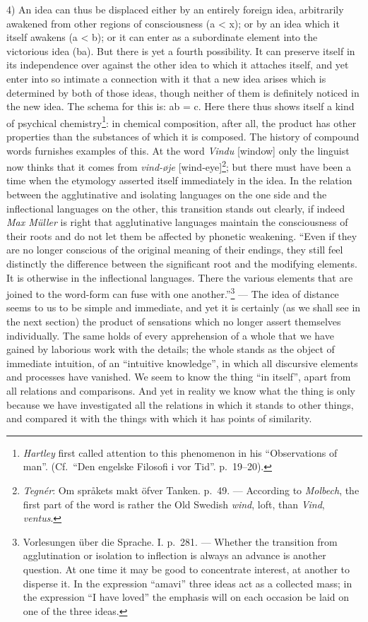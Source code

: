 \documentclass[12pt,a4paper]{book}
\newcommand{\opage}[1]{\marginnote{\footnotesize\textit{[#1]}}}
\begin{document}
4) An idea can thus be displaced either by an entirely foreign idea,
arbitrarily awakened from other regions of consciousness (a < x); or by
an idea which it itself awakens (a < b); or it can enter as a
subordinate element into the victorious idea (ba). But there is yet a
fourth possibility. It can preserve itself in its independence over
against the other idea to which it attaches itself, and yet enter into
so intimate a connection with it that a new idea arises which is
determined by both of those ideas, though neither of them is definitely
noticed in the new idea. The schema for this is: ab = c. Here there
thus shows itself
\opage{198}a kind of psychical chemistry\footnote{\emph{Hartley} first
called attention to this phenomenon in his ``Observations of man''.
(Cf.\ ``Den engelske Filosofi i vor Tid''. p.~19--20).}: in chemical
composition, after all, the product has other properties than the
substances of which it is composed. The history of compound words
furnishes examples of this. At the word \textit{Vindu} [window] only the
linguist now thinks that it comes from
\textit{vind-øje} [wind-eye]\footnote{\emph{Tegnér}: Om språkets makt
öfver Tanken. p.~49. --- According to \emph{Molbech}, the first part of
the word is rather the Old Swedish \textit{wind}, loft, than
\textit{Vind}, \textit{ventus}.}; %
but there must have been a time when the etymology asserted itself
immediately in the idea. In the relation between the agglutinative and
isolating languages on the one side and the inflectional languages on
the other, this transition stands out clearly, if indeed \emph{Max
Müller} is right that agglutinative languages maintain the consciousness
of their roots and do not let them be affected by phonetic weakening.
``Even if they are no longer conscious of the original meaning of their
endings, they still feel distinctly the difference between the
significant root and the modifying elements. It is otherwise in the
inflectional languages. There the various elements that are joined to
the word-form can fuse with one another.''\footnote{Vorlesungen über die
Sprache. I. p.~281. --- Whether the transition from agglutination or
isolation to inflection is always an advance is another question. At
one time it may be good to concentrate interest, at another to disperse
it. In the expression ``amavi'' three ideas act as a collected mass; in
the expression ``I have loved'' the emphasis will on each occasion be
laid on one of the three ideas.} --- The idea of distance seems to us to
be simple and immediate, and yet it is certainly (as we shall see in the
next section) the product of sensations which no longer assert
themselves individually. The same holds of every apprehension of a whole
that we have gained by laborious work with the details; the whole stands
as the object of immediate intuition, of an ``intuitive knowledge'', in
which all discursive elements and processes have vanished. We seem to
know the thing ``in itself'', apart from all relations and comparisons.
And yet in reality we know what the thing is only because we have
investigated all the relations in which it stands
\opage{199}to other things, and compared it with the things with which
it has points of similarity.
\end{document}
